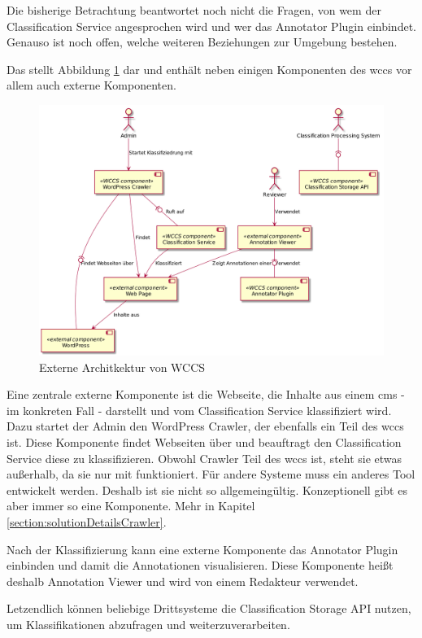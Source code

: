         Die bisherige Betrachtung beantwortet noch nicht die Fragen,
        von wem der Classification Service angesprochen wird und wer das Annotator Plugin einbindet.
        Genauso ist noch offen, welche weiteren Beziehungen zur Umgebung bestehen.

        Das stellt Abbildung \ref{image:wccsExternalArchitecture} dar
        und enthält neben einigen Komponenten des \gls{wccs} vor allem auch
        externe Komponenten.

        \begin{figure}
            \centering
            \includegraphics[width=\textwidth]{../resources/architecture/external_architecture.png}
            \caption{Externe Architkektur von WCCS}
            \label{image:wccsExternalArchitecture}
        \end{figure}

        Eine zentrale externe Komponente ist die Webseite,
        die Inhalte aus einem \gls{cms} - im konkreten Fall {\wordpress} -
        darstellt und vom Classification Service klassifiziert wird.
        Dazu startet der Admin den WordPress Crawler, der ebenfalls ein Teil des \gls{wccs} ist.
        Diese Komponente findet Webseiten über {\wordpress} und beauftragt den
        Classification Service diese zu klassifizieren.
        Obwohl Crawler Teil des \gls{wccs} ist, steht sie etwas außerhalb,
        da sie nur mit {\wordpress} funktioniert. Für andere Systeme muss ein anderes Tool
        entwickelt werden. Deshalb ist sie nicht so allgemeingültig.
        Konzeptionell gibt es aber immer so eine Komponente.
        Mehr in Kapitel \ref{section:solutionDetailsCrawler}.

        Nach der Klassifizierung kann eine externe Komponente das Annotator Plugin
        einbinden und damit die Annotationen visualisieren.
        Diese Komponente heißt deshalb Annotation Viewer und wird von einem Redakteur
        verwendet.

        Letzendlich können beliebige Drittsysteme die Classification Storage API
        nutzen, um Klassifikationen abzufragen und weiterzuverarbeiten.
